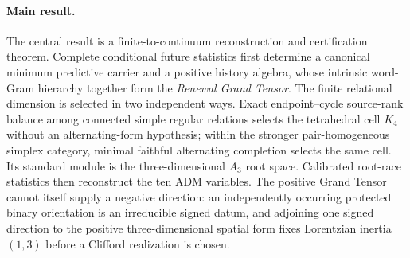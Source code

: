 \documentclass[11pt]{article}
\numberwithin{equation}{section}
\theoremstyle{definition}
\theoremstyle{remark}
\begin{document}
\paragraph{Main result.}
The central result is a finite-to-continuum reconstruction and certification
theorem.  Complete conditional future statistics first determine a canonical
minimum predictive carrier and a positive history algebra, whose intrinsic
word-Gram hierarchy together form the \emph{Renewal Grand Tensor}.  The finite relational dimension is selected in two independent ways.  Exact
endpoint--cycle source-rank balance among connected simple regular relations
selects the tetrahedral cell $K_4$ without an alternating-form hypothesis;
within the stronger pair-homogeneous simplex category, minimal faithful
alternating completion selects the same cell.  Its standard module is the
three-dimensional $A_3$ root space.  Calibrated root-race statistics then
reconstruct the ten ADM variables.  The positive Grand Tensor cannot itself
supply a negative direction: an independently occurring protected binary
orientation is an irreducible signed datum, and adjoining one signed direction
to the positive three-dimensional spatial form fixes Lorentzian inertia
$(1,3)$ before a Clifford realization is chosen.
\end{document}
